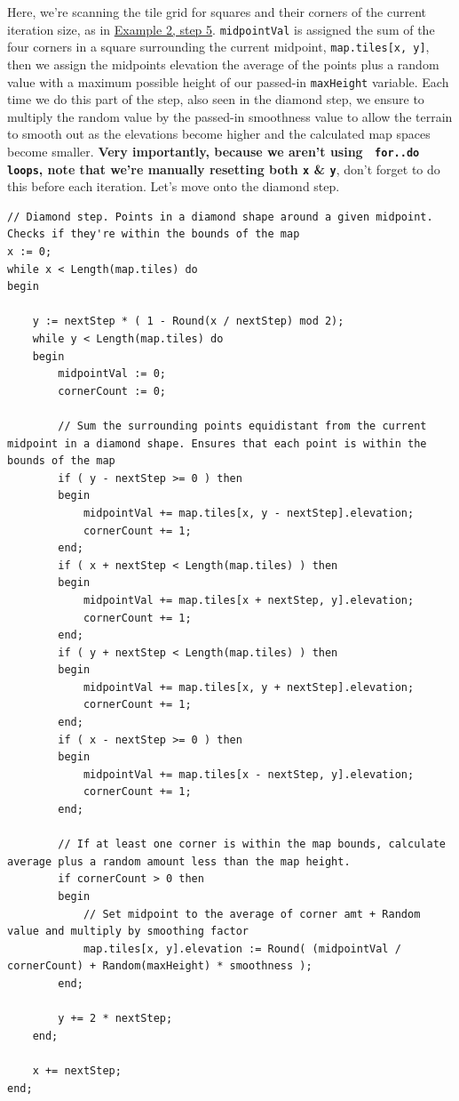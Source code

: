 \documentclass{article}
\begin{document}
Here, we're scanning the tile grid for squares and their corners of the current iteration size, as in \hyperref[fig:graph]{Example 2, step 5}. \texttt{midpointVal} is assigned the sum of the four corners in a square surrounding the current midpoint, \texttt{map.tiles[x, y]}, then we assign the midpoints elevation the average of the points plus a random value with a maximum possible height of our passed-in \texttt{maxHeight} variable. Each time we do this part of the step, also seen in the diamond step, we ensure to multiply the random value by the passed-in smoothness value to allow the terrain to smooth out as the elevations become higher and the calculated map spaces become smaller. \textbf{Very importantly, because we aren't using \ \texttt{for..do loops}, note that we're manually resetting both \texttt{x} \& \texttt{y}}, don't forget to do this before each iteration. Let's move onto the diamond step.


\begin{verbatim}
// Diamond step. Points in a diamond shape around a given midpoint. Checks if they're within the bounds of the map
x := 0;
while x < Length(map.tiles) do
begin

	y := nextStep * ( 1 - Round(x / nextStep) mod 2);
	while y < Length(map.tiles) do
	begin
		midpointVal := 0;
		cornerCount := 0;

		// Sum the surrounding points equidistant from the current midpoint in a diamond shape. Ensures that each point is within the bounds of the map
		if ( y - nextStep >= 0 ) then
		begin
			midpointVal += map.tiles[x, y - nextStep].elevation;
			cornerCount += 1;
		end;
		if ( x + nextStep < Length(map.tiles) ) then
		begin
			midpointVal += map.tiles[x + nextStep, y].elevation;
			cornerCount += 1;
		end;
		if ( y + nextStep < Length(map.tiles) ) then
		begin
			midpointVal += map.tiles[x, y + nextStep].elevation;
			cornerCount += 1;
		end;
		if ( x - nextStep >= 0 ) then
		begin
			midpointVal += map.tiles[x - nextStep, y].elevation;
			cornerCount += 1;
		end;

		// If at least one corner is within the map bounds, calculate average plus a random amount less than the map height.
		if cornerCount > 0 then
		begin
			// Set midpoint to the average of corner amt + Random value and multiply by smoothing factor
			map.tiles[x, y].elevation := Round( (midpointVal / cornerCount) + Random(maxHeight) * smoothness );
		end;

		y += 2 * nextStep;
	end;

	x += nextStep;
end;
\end{verbatim}
\end{document}
